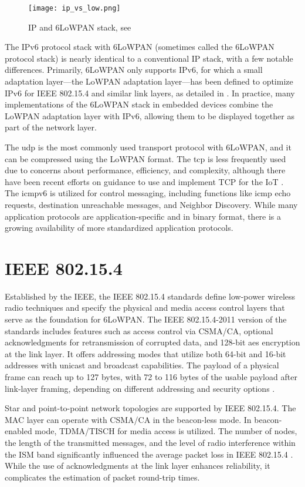   \begin{figure}[h]
    \centering
    \texttt{[image: ip\_vs\_low.png]}
    \caption{IP and 6LoWPAN stack, see \cite[p.~16]{wie}}
    \label{fig:ip_vs_low}
  \end{figure}

  The IPv6 protocol stack with 6LoWPAN (sometimes called the 6LoWPAN protocol stack) is nearly 
  identical to a conventional IP stack, with a few notable differences. Primarily, 6LoWPAN only 
  supports IPv6, for which a small adaptation layer—the LoWPAN adaptation layer—has been defined 
  to optimize IPv6 for IEEE 802.15.4 and similar link layers, as detailed in \cite{rfc4944}. In practice, 
  many implementations of the 6LoWPAN stack in embedded devices combine the LoWPAN adaptation layer 
  with IPv6, allowing them to be displayed together as part of the network layer.

  The \gls{udp} \cite{rfc768} is the most commonly used transport protocol 
  with 6LoWPAN, and it can be compressed using the LoWPAN format. The \gls{tcp} is less frequently used due to concerns about performance, efficiency, and 
  complexity, although there have been recent efforts on guidance to use and implement TCP for the IoT \cite{rfc9006}. 
  The \gls{icmpv6} \cite{rfc4443} is utilized 
  for control messaging, including functions like \gls{icmp} echo requests, destination unreachable messages, 
  and Neighbor Discovery. While many application protocols are application-specific and in binary format, 
  there is a growing availability of more standardized application protocols.

\section{IEEE 802.15.4}
  Established by the IEEE, the IEEE 802.15.4 standards define low-power wireless radio techniques 
  and specify the physical and media access control layers that serve as the foundation for 6LoWPAN. 
  The IEEE 802.15.4-2011 version of the standards includes features such as access control via 
  CSMA/CA, optional acknowledgments for retransmission of corrupted data, and 128-bit  \gls{aes} encryption 
  at the link layer. It offers addressing modes that utilize both 64-bit and 16-bit addresses 
  with unicast and broadcast capabilities. The payload of a physical frame can reach up to 127 bytes, 
  with 72 to 116 bytes of the usable payload after link-layer framing, depending on different addressing 
  and security options \cite[Appendix B.1]{wie}.

  Star and point-to-point network topologies are supported by IEEE 802.15.4. The MAC layer can operate 
  with CSMA/CA in the beacon-less mode. In beacon-enabled mode, TDMA/TISCH for media access is utilized.
  The number of nodes, the length of the transmitted messages, and the level of radio interference 
  within the ISM band significantly influenced the average packet loss in IEEE 802.15.4 \cite{packet_loss}. 
  While the use of acknowledgments at the link layer enhances reliability, it complicates the 
  estimation of packet round-trip times.